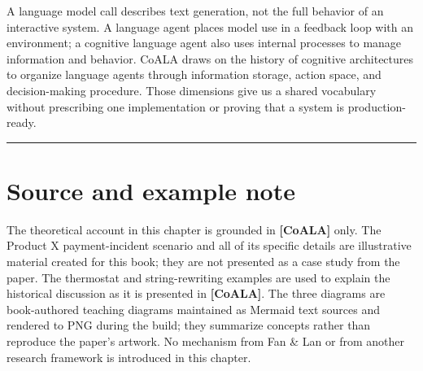 \begin{chapterrecap}
A language model call describes text generation, not the full behavior of an interactive system. A language agent places model use in a feedback loop with an environment; a cognitive language agent also uses internal processes to manage information and behavior. CoALA draws on the history of cognitive architectures to organize language agents through information storage, action space, and decision-making procedure. Those dimensions give us a shared vocabulary without prescribing one implementation or proving that a system is production-ready.
\end{chapterrecap}

\begin{center}\rule{0.5\linewidth}{0.5pt}\end{center}

\section{Source and example note}\label{source-and-example-note}

The theoretical account in this chapter is grounded in \textbf{{[}CoALA{]}} only. The Product X payment-incident scenario and all of its specific details are illustrative material created for this book; they are not presented as a case study from the paper. The thermostat and string-rewriting examples are used to explain the historical discussion as it is presented in \textbf{{[}CoALA{]}}. The three diagrams are book-authored teaching diagrams maintained as Mermaid text sources and rendered to PNG during the build; they summarize concepts rather than reproduce the paper's artwork. No mechanism from Fan \& Lan or from another research framework is introduced in this chapter.
